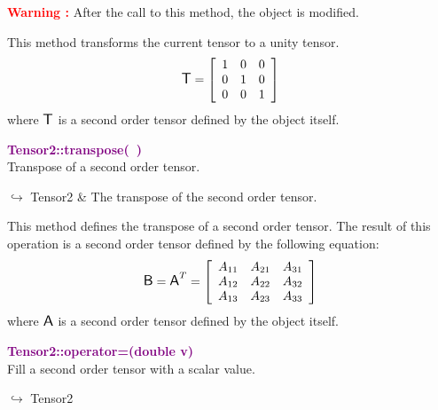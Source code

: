 \hspace*{10mm}\textcolor{red}{\textbf{Warning :}} After the call to this method, the object is modified.

This method transforms the current tensor to a unity tensor.
\begin{equation*}
\mbox{\large\ensuremath{\mathsf{T}}}=\left[\begin{array}{ccc}
1&0&0\\
0&1&0\\
0&0&1
\end{array}\right]
\end{equation*}
where $\mbox{\large\ensuremath{\mathsf{T}}}$ is a second order tensor defined by the object itself.

\textcolor{purple}{\textbf{Tensor2::transpose(~)}}\label{Tensor2::transpose()}\\
Transpose of a second order tensor.\vspace*{-0.5em}
\begin{tcolorbox}[grow to left by=-1cm, width=\textwidth-1cm,myArgs,tabularx={l|R}]
$\hookrightarrow$ Tensor2 & The transpose of the second order tensor.
\end{tcolorbox}

This method defines the transpose of a second order tensor.
The result of this operation is a second order tensor defined by the following equation:
\begin{equation*}
\mbox{\large\ensuremath{\mathsf{B}}}=\mbox{\large\ensuremath{\mathsf{A}}}^T =\left[\begin{array}{ccc}
  A_{11} & A_{21} & A_{31}\\
  A_{12} & A_{22} & A_{32}\\
  A_{13} & A_{23} & A_{33}
  \end{array}\right]
\end{equation*}
where $\mbox{\large\ensuremath{\mathsf{A}}}$ is a second order tensor defined by the object itself.

\textcolor{purple}{\textbf{Tensor2::operator=(double v)}}\label{Tensor2::operator=(double v)}\\
Fill a second order tensor with a scalar value.\vspace*{-0.5em}
\begin{tcolorbox}[grow to left by=-1cm, width=\textwidth-1cm,myArgs,tabularx={l|R}]
$\hookrightarrow$ Tensor2
\end{tcolorbox}


